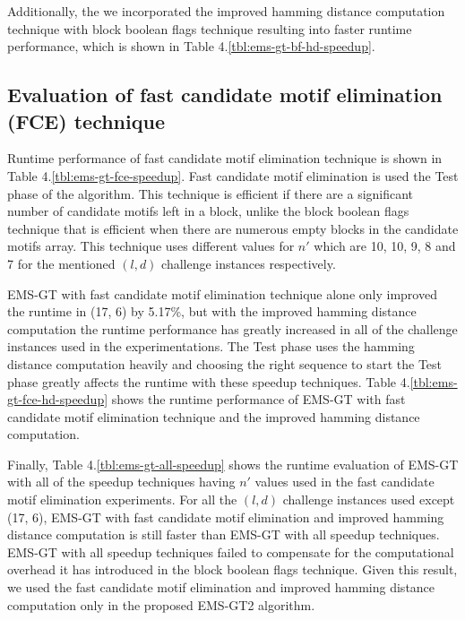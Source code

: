 	

	Additionally, the we incorporated the improved hamming distance computation technique with block boolean flags technique resulting into faster runtime performance, which is shown in Table 4.\ref{tbl:ems-gt-bf-hd-speedup}.

	


	\subsection{Evaluation of fast candidate motif elimination (FCE) technique}
	Runtime performance of fast candidate motif elimination technique is shown in Table 4.\ref{tbl:ems-gt-fce-speedup}. Fast candidate motif elimination is used the Test phase of the algorithm. This technique is efficient if there are a significant number of candidate motifs left in a block, unlike the block boolean flags technique that is efficient when there are numerous empty blocks in the candidate motifs array. This technique uses different values for $n'$ which are 10, 10, 9, 8 and 7 for the mentioned $(l, d)$ challenge instances respectively. 

	

	EMS-GT with fast candidate motif elimination technique alone only improved the runtime in (17, 6) by 5.17\%, but with the improved hamming distance computation the runtime performance has greatly increased in all of the challenge instances used in the experimentations. The Test phase uses the hamming distance computation heavily and choosing the right sequence to start the Test phase greatly affects the runtime with these speedup techniques. Table 4.\ref{tbl:ems-gt-fce-hd-speedup} shows the runtime performance of EMS-GT with fast candidate motif elimination technique and the improved hamming distance computation.

	

	Finally, Table 4.\ref{tbl:ems-gt-all-speedup} shows the runtime evaluation of EMS-GT with all of the speedup techniques having $n'$ values used in the fast candidate motif elimination experiments. For all the $(l, d)$ challenge instances used except (17, 6), EMS-GT with fast candidate motif elimination and improved hamming distance computation is still faster than EMS-GT with all speedup techniques. EMS-GT with all speedup techniques failed to compensate for the computational overhead it has introduced in the block boolean flags technique. Given this result, we used the fast candidate motif elimination and improved hamming distance computation only in the proposed EMS-GT2 algorithm.

